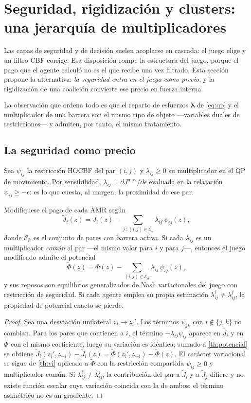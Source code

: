\section{Seguridad, rigidización y clusters: una jerarquía de multiplicadores}
\label{sec:clusters}

Las capas de seguridad y de decisión suelen acoplarse en cascada: el juego
elige y un filtro CBF corrige. Esa disposición rompe la estructura del juego,
porque el pago que el agente calculó no es el que recibe una vez filtrado. Esta
sección propone la alternativa: \emph{la seguridad entra en el juego como
precio}, y la rigidización de una coalición convierte ese precio en fuerza
interna.

La observación que ordena todo es que el reparto de esfuerzos
$\bm\lambda$ de \eqref{eq:qp} y el multiplicador de una barrera son el mismo
tipo de objeto —variables duales de restricciones— y admiten, por tanto, el
mismo tratamiento.

\subsection{La seguridad como precio}

Sea $\psi_{ij}$ la restricción HOCBF del par $(i,j)$ y $\lambda_{ij}\ge0$ su
multiplicador en el QP de movimiento. Por sensibilidad,
$\lambda_{ij}=\partial J^{\mathrm{mov}}/\partial\epsilon$ evaluada en la
relajación $\psi_{ij}\ge-\epsilon$: es lo que cuesta, al margen, la proximidad
de ese par.

\begin{teorema}
\label{th:precio-seguridad}
Modifíquese el pago de cada AMR según
\[
  \tilde J_i(z)=J_i(z)-\!\!\sum_{j\,:\,(i,j)\in\mathcal E_h}\!\!
  \lambda_{ij}\,\psi_{ij}(z),
\]
donde $\mathcal E_h$ es el conjunto de pares con barrera activa. Si cada
$\lambda_{ij}$ es un multiplicador \emph{común} al par —el mismo valor para $i$
y para $j$—, entonces el juego modificado admite el potencial
\[
  \tilde\Phi(z)=\Phi(z)-\sum_{(i,j)\in\mathcal E_h}\lambda_{ij}\,\psi_{ij}(z),
\]
y sus reposos son equilibrios generalizados de Nash variacionales del juego con
restricción de seguridad. Si cada agente emplea su propia estimación
$\lambda_{ij}^{i}\neq\lambda_{ij}^{j}$, la propiedad de potencial exacto se
pierde.
\end{teorema}

\begin{proof}
Sea una desviación unilateral $z_i\to z_i'$. Los términos $\psi_{jk}$ con
$i\notin\{j,k\}$ no cambian. Para los pares que contienen a $i$, el término
$-\lambda_{ij}\psi_{ij}$ aparece en $\tilde J_i$ y en $\tilde\Phi$ con el mismo
coeficiente, luego su variación es idéntica; sumado a
\cref{th:potencial} se obtiene
$\tilde J_i(z_i',z_{-i})-\tilde J_i(z)=\tilde\Phi(z_i',z_{-i})-\tilde\Phi(z)$.
El carácter variacional se sigue de \cref{th:vi} aplicado a $\tilde\Phi$ con la
restricción compartida $\psi_{ij}\ge0$ y multiplicador común.
Si $\lambda_{ij}^{i}\neq\lambda_{ij}^{j}$, la contribución del par a $\tilde J_i$
y a $\tilde J_j$ difiere y no existe función escalar cuya variación coincida con
la de ambos: el término asimétrico no es un gradiente.
\end{proof}

